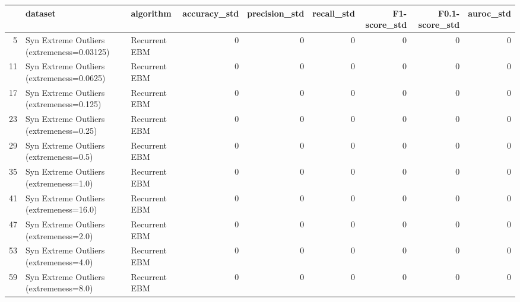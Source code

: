 \begin{tabular}{rllrrrrrr}
\hline
    & dataset                                    & algorithm     &   accuracy\_std &   precision\_std &   recall\_std &   F1-score\_std &   F0.1-score\_std &   auroc\_std \\
\hline
  5 & Syn Extreme Outliers (extremeness=0.03125) & Recurrent EBM &              0 &               0 &            0 &              0 &                0 &           0 \\
 11 & Syn Extreme Outliers (extremeness=0.0625)  & Recurrent EBM &              0 &               0 &            0 &              0 &                0 &           0 \\
 17 & Syn Extreme Outliers (extremeness=0.125)   & Recurrent EBM &              0 &               0 &            0 &              0 &                0 &           0 \\
 23 & Syn Extreme Outliers (extremeness=0.25)    & Recurrent EBM &              0 &               0 &            0 &              0 &                0 &           0 \\
 29 & Syn Extreme Outliers (extremeness=0.5)     & Recurrent EBM &              0 &               0 &            0 &              0 &                0 &           0 \\
 35 & Syn Extreme Outliers (extremeness=1.0)     & Recurrent EBM &              0 &               0 &            0 &              0 &                0 &           0 \\
 41 & Syn Extreme Outliers (extremeness=16.0)    & Recurrent EBM &              0 &               0 &            0 &              0 &                0 &           0 \\
 47 & Syn Extreme Outliers (extremeness=2.0)     & Recurrent EBM &              0 &               0 &            0 &              0 &                0 &           0 \\
 53 & Syn Extreme Outliers (extremeness=4.0)     & Recurrent EBM &              0 &               0 &            0 &              0 &                0 &           0 \\
 59 & Syn Extreme Outliers (extremeness=8.0)     & Recurrent EBM &              0 &               0 &            0 &              0 &                0 &           0 \\
\hline
\end{tabular}

